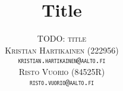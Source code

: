 \documentclass[twoside]{article}
\title{\vspace{-15mm}\fontsize{24pt}{10pt}\selectfont\textbf{Title}}
\author{
\large
\textsc{TODO: title}\\[2mm]
\textsc{Kristian Hartikainen (222956)}\\[2mm]
\textsc{\tt kristian.hartikainen@aalto.fi}\\[2mm]
\textsc{Risto Vuorio (84525R)}\\[2mm]
\textsc{\tt risto.vuorio@aalto.fi}\\[2mm]
\vspace{-5mm}
}
\date{}
\begin{document}
\maketitle %


\begin{abstract}

\noindent \lipsum[1]

\end{abstract}

\end{document}
